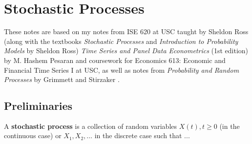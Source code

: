 %
%
%
%
%
%
%
%
%
%
%
%
%
%

\chapter{Stochastic Processes}

These notes are based on my notes from ISE 620 at USC taught by Sheldon Ross (along with the textbooks \textit{Stochastic Processes} \citep{ross2008stochastic} and \textit{Introduction to Probability Models} \citep{2014i} by Sheldon Ross) \textit{Time Series and Panel Data Econometrics} (1st edition) by M. Hashem Pesaran \citep{pesaran-2015-text} and coursework for Economics 613: Economic and Financial Time Series I at USC, as well as notes from \textit{Probability and Random Processes} by Grimmett and Stirzaker \citep{grimmett2001probability}.

\section{Preliminaries}

\begin{definition} A \textbf{stochastic process} is a collection of random variables \(X(t), t\geq 0\) (in the continuous case) or \(X_1, X_2, \ldots\) in the discrete case such that ...

\end{definition}

